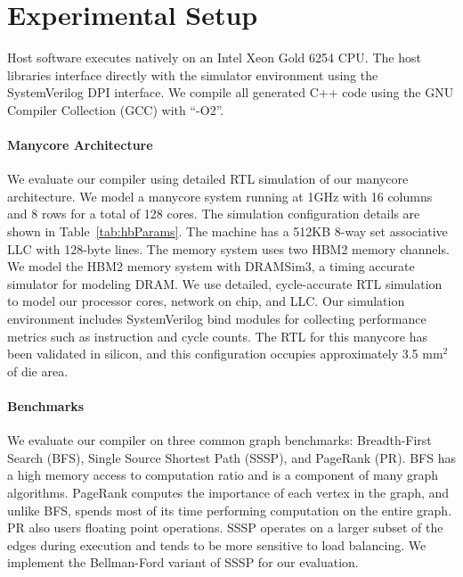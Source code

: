 %




\section{Experimental Setup}
Host software executes natively on an Intel Xeon Gold 6254 CPU.
The host libraries interface directly with the simulator environment using the SystemVerilog DPI interface.
We compile all generated C++ code using the GNU Compiler Collection (GCC) with ``-O2''.
\tabHBParams
\paragraph{Manycore Architecture}
\evalGraphsTab

We evaluate our compiler using detailed RTL simulation of our manycore architecture.
We model a manycore system running at 1GHz with 16 columns and 8 rows for a total of 128 cores.
The simulation configuration details are shown in Table~\ref{tab:hbParams}.
The machine has a 512KB 8-way set associative LLC with 128-byte lines.
The memory system uses two HBM2 memory channels.
We model the HBM2 memory system with DRAMSim3\cite{li2019dramsim3},  a timing accurate simulator for modeling DRAM.
We use detailed, cycle-accurate RTL simulation to model our processor cores, network on chip, and LLC.
Our simulation environment includes SystemVerilog bind modules for collecting performance metrics such as instruction and cycle counts.
The RTL for this manycore has been validated in silicon, and this configuration occupies approximately 3.5 mm$^2$ of die area. 


\paragraph{Benchmarks} We evaluate our compiler on three common graph benchmarks: Breadth-First Search (BFS), Single Source Shortest Path (SSSP), and PageRank (PR). 
BFS has a high memory access to computation ratio and is a component of many graph algorithms.
PageRank computes the importance of each vertex in the graph, and unlike BFS, spends most of its time performing computation on the entire graph.
PR also users floating point operations.
SSSP operates on a larger subset of the edges during execution and tends to be more sensitive to load balancing.
We implement the Bellman-Ford variant of SSSP for our evaluation.

